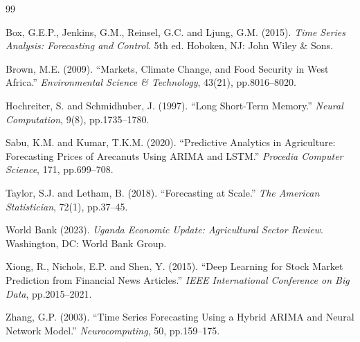 \documentclass[12pt,a4paper]{article}
\begin{document}
\newpage
\begin{thebibliography}{99}

Box, G.E.P., Jenkins, G.M., Reinsel, G.C. and Ljung, G.M. (2015). \textit{Time Series Analysis: Forecasting and Control}. 5th ed. Hoboken, NJ: John Wiley \& Sons.

Brown, M.E. (2009). ``Markets, Climate Change, and Food Security in West Africa.'' \textit{Environmental Science \& Technology}, 43(21), pp.8016--8020.

Hochreiter, S. and Schmidhuber, J. (1997). ``Long Short-Term Memory.'' \textit{Neural Computation}, 9(8), pp.1735--1780.

Sabu, K.M. and Kumar, T.K.M. (2020). ``Predictive Analytics in Agriculture: Forecasting Prices of Arecanuts Using ARIMA and LSTM.'' \textit{Procedia Computer Science}, 171, pp.699--708.

Taylor, S.J. and Letham, B. (2018). ``Forecasting at Scale.'' \textit{The American Statistician}, 72(1), pp.37--45.

World Bank (2023). \textit{Uganda Economic Update: Agricultural Sector Review}. Washington, DC: World Bank Group.

Xiong, R., Nichols, E.P. and Shen, Y. (2015). ``Deep Learning for Stock Market Prediction from Financial News Articles.'' \textit{IEEE International Conference on Big Data}, pp.2015--2021.

Zhang, G.P. (2003). ``Time Series Forecasting Using a Hybrid ARIMA and Neural Network Model.'' \textit{Neurocomputing}, 50, pp.159--175.

\end{thebibliography}
\end{document}
